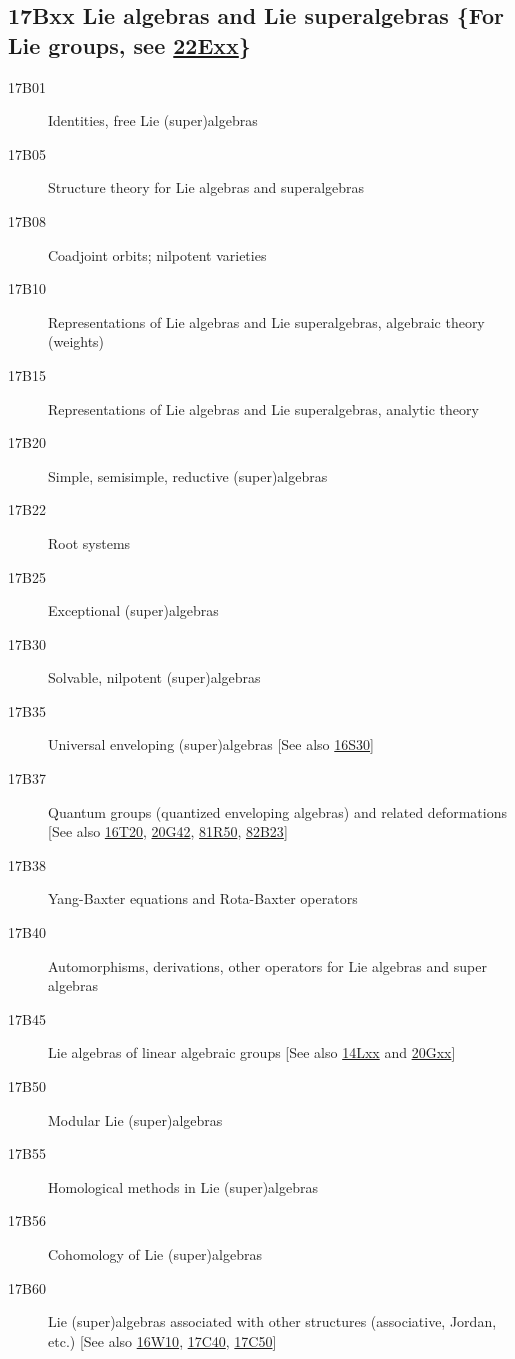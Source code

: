 \subsection*{17Bxx  Lie algebras and Lie superalgebras \{For Lie groups, see \hyperref[22Exx]{22Exx}\} }\label{17Bxx}
\begin{description}  
\item [17B01]\label{17B01} Identities, free Lie (super)algebras
\item [17B05]\label{17B05} Structure theory for Lie algebras and superalgebras 
\item [17B08]\label{17B08} Coadjoint orbits; nilpotent varieties
\item [17B10]\label{17B10} Representations of Lie algebras and Lie superalgebras, algebraic theory (weights)
\item [17B15]\label{17B15} Representations of Lie algebras and Lie superalgebras, analytic theory
\item [17B20]\label{17B20} Simple, semisimple, reductive (super)algebras
\item [17B22]\label{17B22} Root systems
\item [17B25]\label{17B25} Exceptional (super)algebras
\item [17B30]\label{17B30} Solvable, nilpotent (super)algebras
\item [17B35]\label{17B35} Universal enveloping (super)algebras [See also \hyperref[16S30]{16S30}]
\item [17B37]\label{17B37} Quantum groups (quantized enveloping algebras) and related deformations [See also \hyperref[16T20]{16T20}, \hyperref[20G42]{20G42}, \hyperref[81R50]{81R50}, \hyperref[82B23]{82B23}]
\item [17B38]\label{17B38} Yang-Baxter equations and Rota-Baxter operators
\item [17B40]\label{17B40} Automorphisms, derivations, other operators for Lie algebras and super algebras
\item [17B45]\label{17B45} Lie algebras of linear algebraic groups [See also \hyperref[14Lxx]{14Lxx} and \hyperref[20Gxx]{20Gxx}]
\item [17B50]\label{17B50} Modular Lie (super)algebras
\item [17B55]\label{17B55} Homological methods in Lie (super)algebras
\item [17B56]\label{17B56} Cohomology of Lie (super)algebras
\item [17B60]\label{17B60} Lie (super)algebras associated with other structures (associative, Jordan, etc.) [See also \hyperref[16W10]{16W10}, \hyperref[17C40]{17C40}, \hyperref[17C50]{17C50}]

\end{description}
